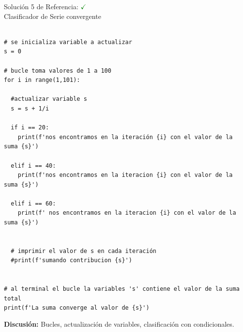 \documentclass[10pt]{beamer}
\begin{document}
\begin{frame}[fragile]{Solución 5 de Referencia: \hfill \textcolor{green}{$\checkmark$} \\ Clasificador de Serie convergente}
\begin{verbatim}

# se inicializa variable a actualizar 
s = 0

# bucle toma valores de 1 a 100
for i in range(1,101):

  #actualizar variable s 
  s = s + 1/i

  if i == 20:
    print(f'nos encontramos en la iteración {i} con el valor de la suma {s}')

  elif i == 40:
    print(f'nos encontramos en la iteracion {i} con el valor de la suma {s}')

  elif i == 60:
    print(f' nos encontramos en la iteracion {i} con el valor de la suma {s}')


  # imprimir el valor de s en cada iteración
  #print(f'sumando contribucion {s}')


# al terminal el bucle la variables 's' contiene el valor de la suma total 
print(f'La suma converge al valor de {s}')
\end{verbatim}
\vspace{-0.4em}
{\scriptsize \textbf{Discusión:} Bucles, actualización de variables, clasificación con condicionales.}
\end{frame}
\end{document}
